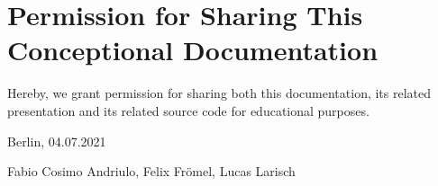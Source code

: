 \section*{Permission for Sharing This Conceptional Documentation}

Hereby, we grant permission for sharing both this documentation, its related presentation and its related source code for educational purposes.

\vspace{15mm}

{\setlength{\parindent}{0cm}
Berlin, 04.07.2021

Fabio Cosimo Andriulo,
    Felix Frömel,
    Lucas Larisch
}

